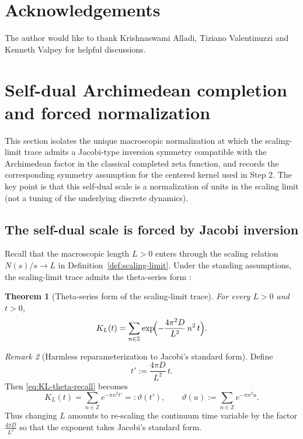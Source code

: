 \documentclass[12pt]{amsart}
\newtheorem{theorem}{Theorem}[section]
\theoremstyle{definition}
\theoremstyle{remark}
\newtheorem{remark}[theorem]{Remark}
\newcommand{\Z}{\mathbb{Z}}
\begin{document}
\section{Acknowledgements}
The author would like to thank Krishnaswami Alladi, Tiziano Valentinuzzi and Kenneth Valpey for helpful discussions.


\section{Self-dual Archimedean completion and forced normalization}
\label{sec:completion-selfdual}

This section isolates the unique macroscopic normalization at which the scaling-limit trace admits a Jacobi-type inversion symmetry compatible with the Archimedean factor in the classical completed zeta function, and records the corresponding symmetry assumption for the centered kernel used in Step 2. The key point is that this self-dual scale is a normalization
of units in the scaling limit (not a tuning of the underlying discrete dynamics).

\subsection{The self-dual scale is forced by Jacobi inversion}

Recall that the macroscopic length $L>0$ enters through the scaling relation $N(s)/s\to L$
in Definition~\ref{def:scaling-limit}. Under the standing assumptions,
the scaling-limit trace admits the theta-series form :

\begin{theorem}[Theta-series form of the scaling-limit trace]
\label{thm:theta-series-form-recall}
For every $L>0$ and $t>0$,
\begin{equation}\label{eq:KL-theta-recall}
K_L(t)=\sum_{n\in\Z}\exp\!\Bigl(-\frac{4\pi^2D}{L^2}\,n^2\,t\Bigr).
\end{equation}
\end{theorem}

\begin{remark}[Harmless reparameterization to Jacobi's standard form]
\label{rem:self-dual-canonical}
Define
\begin{equation}\label{eq:tprime}
t' := \frac{4\pi D}{L^2}\,t.
\end{equation}
Then \eqref{eq:KL-theta-recall} becomes
\[
K_L(t)=\sum_{n\in\Z}e^{-\pi n^2 t'}=:\vartheta(t'),
\qquad
\vartheta(u):=\sum_{n\in\Z}e^{-\pi n^2 u}.
\]
Thus changing $L$ amounts to re-scaling the continuum time variable by the factor
$\frac{4\pi D}{L^2}$ so that the exponent takes Jacobi's standard form.
\end{remark}
\end{document}
